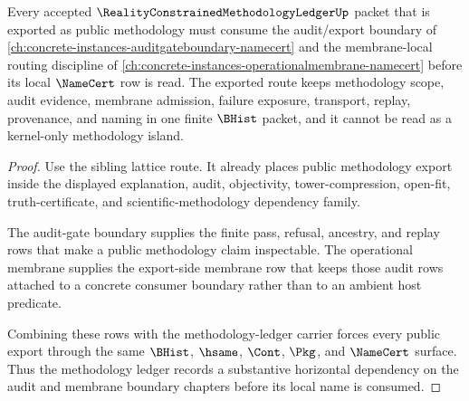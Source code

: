 \begin{theorem}
\label{thm:reality-constrained-methodology-ledger-audit-membrane-dependency}
Every accepted $\RealityConstrainedMethodologyLedgerUp$ packet that is exported as public methodology must consume the audit/export boundary of \autoref{ch:concrete-instances-auditgateboundary-namecert} and the membrane-local routing discipline of \autoref{ch:concrete-instances-operationalmembrane-namecert} before its local $\NameCert$ row is read. The exported route keeps methodology scope, audit evidence, membrane admission, failure exposure, transport, replay, provenance, and naming in one finite $\BHist$ packet, and it cannot be read as a kernel-only methodology island.
\end{theorem}
\begin{proof}
Use the sibling lattice route. It already places public methodology export inside the displayed explanation, audit, objectivity, tower-compression, open-fit, truth-certificate, and scientific-methodology dependency family.

The audit-gate boundary supplies the finite pass, refusal, ancestry, and replay rows that make a public methodology claim inspectable. The operational membrane supplies the export-side membrane row that keeps those audit rows attached to a concrete consumer boundary rather than to an ambient host predicate.

Combining these rows with the methodology-ledger carrier forces every public export through the same $\BHist$, $\hsame$, $\Cont$, $\Pkg$, and $\NameCert$ surface. Thus the methodology ledger records a substantive horizontal dependency on the audit and membrane boundary chapters before its local name is consumed.
\end{proof}
